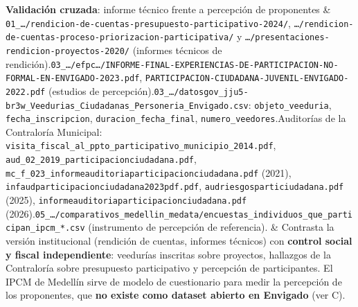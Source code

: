 \documentclass[11pt,a4paper]{article}
\begin{document}
{\begin{longtable}
\textbf{Validación cruzada}: informe técnico frente a percepción de proponentes & \texttt{01\_\allowbreak{}\ldots{}/\allowbreak{}rendicion-\allowbreak{}de-\allowbreak{}cuentas-\allowbreak{}presupuesto-\allowbreak{}participativo-\allowbreak{}2024/\allowbreak{}}, \texttt{\ldots{}/\allowbreak{}rendicion-\allowbreak{}de-\allowbreak{}cuentas-\allowbreak{}proceso-\allowbreak{}priorizacion-\allowbreak{}participativa/\allowbreak{}} y \texttt{\ldots{}/\allowbreak{}presentaciones-\allowbreak{}rendicion-\allowbreak{}proyectos-\allowbreak{}2020/\allowbreak{}} (informes técnicos de rendición).\newline \texttt{03\_\allowbreak{}\ldots{}/\allowbreak{}efpc\ldots{}/\allowbreak{}INFORME-\allowbreak{}FINAL-\allowbreak{}EXPERIENCIAS-\allowbreak{}DE-\allowbreak{}PARTICIPACION-\allowbreak{}NO-\allowbreak{}FORMAL-\allowbreak{}EN-\allowbreak{}ENVIGADO-\allowbreak{}2023.\allowbreak{}pdf}, \texttt{PARTICIPACION-\allowbreak{}CIUDADANA-\allowbreak{}JUVENIL-\allowbreak{}ENVIGADO-\allowbreak{}2022.\allowbreak{}pdf} (estudios de percepción).\newline \texttt{03\_\allowbreak{}\ldots{}/\allowbreak{}datosgov\_\allowbreak{}jju5-\allowbreak{}br3w\_\allowbreak{}Veedurias\_\allowbreak{}Ciudadanas\_\allowbreak{}Personeria\_\allowbreak{}Envigado.\allowbreak{}csv}: \texttt{objeto\_\allowbreak{}veeduria}, \texttt{fecha\_\allowbreak{}inscripcion}, \texttt{duracion\_\allowbreak{}fecha\_\allowbreak{}final}, \texttt{numero\_\allowbreak{}veedores}.\newline Auditorías de la Contraloría Municipal: \texttt{visita\_\allowbreak{}fiscal\_\allowbreak{}al\_\allowbreak{}ppto\_\allowbreak{}participativo\_\allowbreak{}municipio\_\allowbreak{}2014.\allowbreak{}pdf}, \texttt{aud\_\allowbreak{}02\_\allowbreak{}2019\_\allowbreak{}participacionciudadana.\allowbreak{}pdf}, \texttt{mc\_\allowbreak{}f\_\allowbreak{}023\_\allowbreak{}informeauditoriaparticipacionciudadana.\allowbreak{}pdf} (2021), \texttt{infaudparticipacionciudadana2023pdf.\allowbreak{}pdf}, \texttt{audriesgosparticiudadana.\allowbreak{}pdf} (2025), \texttt{informeauditoriaparticipacionciudadana.\allowbreak{}pdf} (2026).\newline \texttt{05\_\allowbreak{}\ldots{}/\allowbreak{}comparativos\_\allowbreak{}medellin\_\allowbreak{}medata/\allowbreak{}encuestas\_\allowbreak{}individuos\_\allowbreak{}que\_\allowbreak{}participan\_\allowbreak{}ipcm\_\allowbreak{}*.\allowbreak{}csv} (instrumento de percepción de referencia). & Contrasta la versión institucional (rendición de cuentas, informes técnicos) con \textbf{control social y fiscal independiente}: veedurías inscritas sobre proyectos, hallazgos de la Contraloría sobre presupuesto participativo y percepción de participantes. El IPCM de Medellín sirve de modelo de cuestionario para medir la percepción de los proponentes, que \textbf{no existe como dataset abierto en Envigado} (ver C). \\

\end{longtable}}
\end{document}

